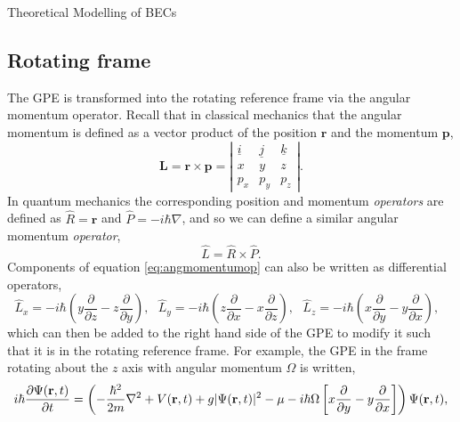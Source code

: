 \begin{chapter}{\label{cha:theoretical_model}Theoretical Modelling of BECs}
	\subsection{\label{section:rotatingframe} Rotating frame}
	The GPE is transformed into the rotating reference frame via the angular momentum operator. Recall that in classical mechanics that the angular momentum is defined as a vector product of the position $\mathbf{r}$ and the momentum $\mathbf{p}$,
	\begin{equation*}
		\mathbf{L} = \mathbf{r} \times \mathbf{p} = 
		\left| \begin{array}{ccc}
\underline{i} & \underline{j} & \underline{k} \\
x & y & z \\
p_x & p_y & p_z \end{array} \right|.
	\end{equation*}
	In quantum mechanics the corresponding position and momentum {\it operators} are defined as $\hat{R} = \mathbf{r}$ and $\hat{P} = -i\hbar\nabla$, and so we can define a similar angular momentum {\it operator},
	\begin{equation}\label{eq:angmomentumop}
		\hat{L} = \hat{R} \times \hat{P}.
	\end{equation}
	Components of equation \ref{eq:angmomentumop} can also be written as differential operators,
	\begin{equation}
		\hat{L}_x = -i\hbar\left ( y \frac{\partial}{\partial z} - z \frac{\partial}{\partial y} \right ),~~~
		\hat{L}_y = -i\hbar\left ( z \frac{\partial}{\partial x} - x \frac{\partial}{\partial z} \right ),~~~
		\hat{L}_z = -i\hbar\left ( x \frac{\partial}{\partial y} - y \frac{\partial}{\partial x} \right ),~~~
	\end{equation}
 which can then be added to the right hand side of the GPE to modify it such that it is in the rotating reference frame. For example, the GPE in the frame rotating about the $z$ axis with angular momentum $\Omega$ is written,
	\begin{equation}\label{eq:rotframegpe}
	i\hbar \frac{\partial\Psi({\bf r},t)}{\partial t} = \left(-\frac{\hbar^2}{2m}\nabla^2 + V({\bf r},t) + g|\Psi({\bf r},t)|^2 - \mu -i\hbar\Omega\left [ x \frac{\partial}{\partial y} - y \frac{\partial}{\partial x} \right ] \right ) \Psi({\bf r},t),
	\end{equation}


\end{chapter}
